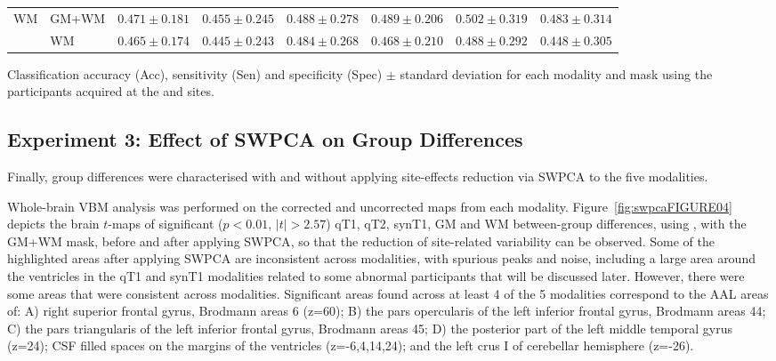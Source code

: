 \begin{bigtable}
\begin{tabularx}{\linewidth}{ll|XXX|XXX}
		\midrule
		\multirow{2}{*}{\ac{WM}} &GM+WM &		$ 0.471 \pm 0.181 $ & $ 0.455 \pm 0.245 $ & $ 0.488 \pm 0.278 $ & $ 0.489 \pm 0.206 $ & $ 0.502 \pm 0.319 $ &  $ 0.483 \pm 0.314 $ \\
		&		WM &		$ 0.465 \pm 0.174 $ & $ 0.445 \pm 0.243 $ & $ 0.484 \pm 0.268 $ & $ 0.468 \pm 0.210 $ & $ 0.488 \pm 0.292 $ &  $ 0.448 \pm 0.305 $ \\
		\bottomrule
	\end{tabularx}
	\caption[Classification accuracy (Acc), sensitivity (Sen) and specificity (Spec) $\pm$ standard deviation for each modality and mask using the participants acquired at the \lon{} and \cam{} sites.]{Classification accuracy (Acc), sensitivity (Sen) and specificity (Spec) $\pm$ standard deviation for each modality and mask using the participants acquired at the \lon{} and \cam{} sites.}
	\label{tab:swpcaLONCAM}
\end{bigtable}



\subsection{Experiment 3: Effect of \acs{SWPCA} on Group Differences}\label{sec:swpcaE3}
Finally, group differences were characterised with and without applying site-effects reduction via \ac{SWPCA} to the five modalities. 

Whole-brain \ac{VBM} analysis was performed on the corrected and uncorrected maps from each modality. Figure~\ref{fig:swpcaFIGURE04} depicts the brain $t$-maps of significant ($p<0.01$, $|t|>2.57$) \ac{qT1}, \ac{qT2}, \ac{synT1}, \ac{GM} and \ac{WM} between-group differences, using \all{}, with the GM+WM mask, before and after applying \ac{SWPCA}, so that the reduction of site-related variability can be observed. Some of the highlighted areas after applying \ac{SWPCA} are inconsistent across modalities, with spurious peaks and noise, including a large area around the ventricles in the \ac{qT1} and \ac{synT1} modalities related to some abnormal participants that will be discussed later. However, there were some areas that were consistent across modalities. Significant areas found across at least 4 of the 5 modalities correspond to the \ac{AAL} \cite{Tzourio-Mazoyer2002} areas of: A) right superior frontal gyrus, Brodmann areas 6 (z=60); B) the pars opercularis of the left inferior frontal gyrus, Brodmann areas 44; C) the pars triangularis of the left inferior frontal gyrus, Brodmann areas 45; D) the posterior part of the left middle temporal gyrus (z=24); \ac{CSF} filled spaces on the margins of the ventricles (z=-6,4,14,24); and the left crus I of cerebellar hemisphere (z=-26).

